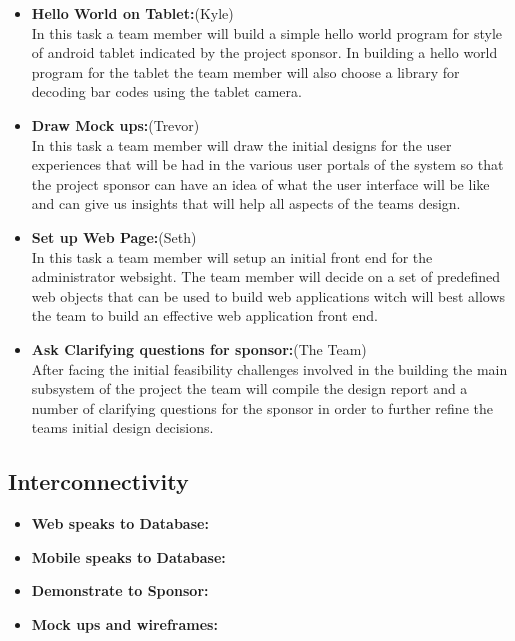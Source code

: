 \documentclass[Letter,11pt]{article}
\begin{document}
\begin{itemize}
			\item\textbf{Hello World on Tablet:}(Kyle)\\
			In this task a team member will build a simple hello world program for style of android tablet indicated by the project sponsor. In building a hello world program for the tablet the team member will also choose a library for decoding bar codes using the tablet camera. 
			
			\item\textbf{Draw Mock ups:}(Trevor)\\
			In this task a team member will draw the initial designs for the user experiences that will be had in the various user portals of the system so that the project sponsor can have an idea of what the user interface will be like and can give us insights that will help all aspects of the teams design. 
			
			\item\textbf{Set up Web Page:}(Seth)\\
			In this task a team member will setup an initial front end for the administrator websight. The team member will decide on a set of predefined web objects that can be used to build web applications witch will best allows the team to build an effective web application front end. 
			
			\item\textbf{Ask Clarifying questions for sponsor:}(The Team)\\
			After facing the initial feasibility challenges involved in the building the main subsystem of the project the team will compile the design report and a number of clarifying questions for the sponsor in order to further refine the teams initial design decisions. 
		\end{itemize}
		
		
		
	\subsection{Interconnectivity}\label{connect}
		
		\begin{itemize}
			\item\textbf{Web speaks to Database:}\\
			
			\item \textbf{Mobile speaks to Database:}\\
			
			\item\textbf{Demonstrate to Sponsor:}\\
			
			\item\textbf{Mock ups and wireframes:}\\
			
		\end{itemize}
		
\end{document}
